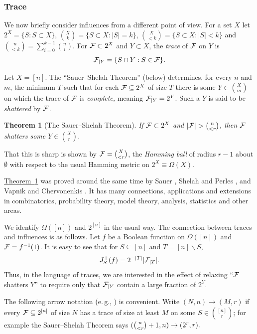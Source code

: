 \documentclass[11pt]{article}
\numberwithin{equation}{section}
\theoremstyle{definition}
\theoremstyle{plain}
\newcommand{\eg}{e.\,g.}
\newcommand{\expref}[2]{\hyperref[#2]{#1~\ref{#2}}}
\newtheorem{thm}{Theorem}[section]
\newcommand{\nin}[0]{\noindent}
\newcommand{\sub}[0]{\subseteq}
\newcommand{\f}[0]{{\cal F}}
\newcommand{\0}[0]{\emptyset}
\newcommand{\Cc}[0]{\tbinom}
\newcommand{\gO}[0]{\Omega}
\begin{document}
\subsubsection *{Trace}


We now briefly consider influences from a different point of view.
For a set $X$ let
$2^X = \{S: S \subset X\}$,
$\binom{X}{k}=\{S \subset X:|S|=k\}$,
$\binom{X}{< k}=\{S \subset X:|S| < k\}$ and 
$\binom{n}{<k}=\sum_{i=0}^{k-1} \binom{n}{i}.$
For $\f\subset 2^X$
and $Y \subset X$,
the \emph{trace} of $\cal F$ on $Y$ is
$${\cal F}_{|Y} = \{S \cap Y:
S \in {\cal F}\}.$$

Let $X = [n]$.
%
The ``Sauer--Shelah Theorem'' (below)
determines, for every $n$ and $m$, the minimum $T$
such that for each $\f\sub 2^X$ of size $T$ there is some
$Y \in \binom{X}{m}$ on which the trace of $\f$ is \emph{complete,}
meaning ${\cal F}_{|Y}=2^Y$. Such a $Y$
is said to be \emph{shattered} by ${\cal F}$.

\begin {thm}[The Sauer--Shelah Theorem]
\label {t:sas}
If ${\cal F} \subset 2^{X}$ and
$|\f| > \binom{n}{< r} $,
%
then $\f$ shatters some $Y\in \binom{X}{r}$.
\end {thm}

\nin
That this is sharp is shown by
${\cal F} = \binom{X}{< r}$, the \emph{Hamming ball}
of radius $r-1$ about
$\0$ with respect to the usual Hamming metric on
$2^{X}\equiv \gO(X)$.

\expref{Theorem}{t:sas} was proved
around the same time by Sauer \cite {Sa},
Shelah and Perles \cite{Sh}, and Vapnik and Chervonenkis \cite {VC}.
%
It has many connections, applications and extensions
in combinatorics, probability theory, model theory, analysis, statistics
and other areas.
%

We identify $\gO([n])$ and $2^{[n]}$ in the usual way.
The connection between traces and influences is as follows.
Let $f$ be a Boolean function on $\gO([n])$
and
${\cal F} =f^{-1}(1)$.
It is easy to see
that for
$S\sub [n]$ and $T = [n] \backslash S$,
$$J^+_S(f)=2^{-|T|}|{\cal F}_{|T}| .$$
Thus, in the language of traces, we are interested in
the effect of relaxing ``$\f$ shatters $Y$''
to require only that
${\cal F}_{|Y}$ contain a large fraction of $2^Y$.

The following arrow notation
(\eg, \cite {Bo,Fr,AMS19}) is convenient.  Write
$(N,n) \to (M,r)$ if every $\f\sub 2^{[n]}$
of size %
$N$   %
has a trace of size at least $M$ on some
$S \in \binom{[n]}{r}$; for example the Sauer--Shelah Theorem
says $(\Cc{n}{< r}+1,n) \to (2^r,r).$
\end{document}
